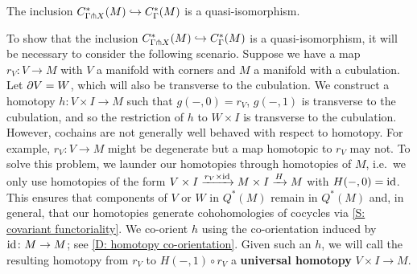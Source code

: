 \begin{theorem}\label{T: transverse complex}
	The inclusion $C^*_{\Gamma \pitchfork X}(M) \hookrightarrow C^*_\Gamma(M)$ is a quasi-isomorphism.
\end{theorem}

To show that the inclusion $C^*_{\Gamma \pitchfork X}(M) \hookrightarrow C^*_\Gamma(M)$ is a quasi-isomorphism, it will be necessary to consider the following scenario.
Suppose we have a map $r_V \colon V \to M$ with $V$ a manifold with corners and $M$ a manifold with a cubulation.
Let $\partial V = W$, which will also be transverse to the cubulation.
We construct a homotopy $h \colon V \times I \to M$ such that $g(-,0) = r_V$, $g(-,1)$ is transverse to the cubulation, and so the restriction of $h$ to $W \times I$ is transverse to the cubulation.
However, cochains are not generally well behaved with respect to homotopy.
For example, $r_V \colon V \to M$ might be degenerate but a map homotopic to $r_V$ may not.
To solve this problem, we launder our homotopies through homotopies of $M$, i.e.\ we only use homotopies of the form $V \times I \xrightarrow{r_V \times \mathrm{id}} M \times I \xrightarrow{H} M$ with $H(-,0) = \mathrm{id}$.
This ensures that components of $V$ or $W$ in $Q^*(M)$ remain in $Q^*(M)$ and, in general, that our homotopies generate cohohomologies of cocycles via
\cref{S: covariant functoriality}.
We co-orient $h$ using the co-orientation induced by $\mathrm{id} \colon M \to M$; see \cref{D: homotopy co-orientation}.
Given such an $h$, we will call the resulting homotopy from $r_V$ to $H(-,1) \circ r_V$ a \textbf{universal homotopy} $V \times I \to M$.

